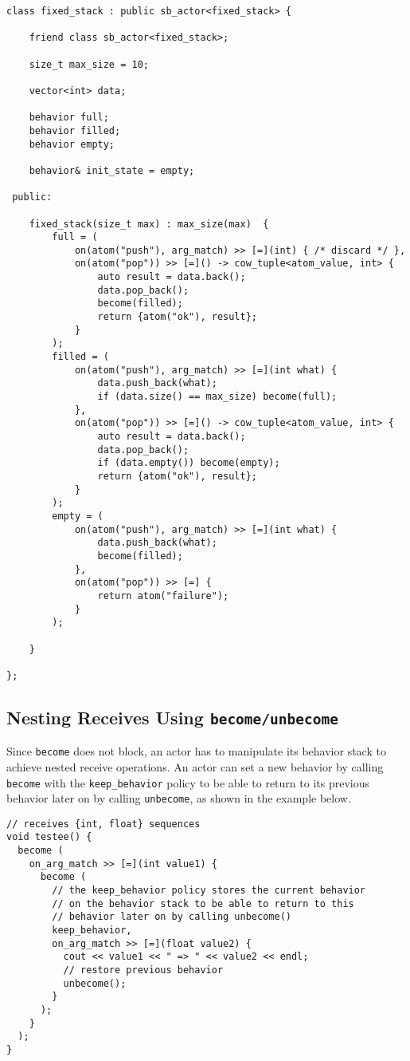 \clearpage
\begin{lstlisting}
class fixed_stack : public sb_actor<fixed_stack> {

    friend class sb_actor<fixed_stack>;

    size_t max_size = 10;

    vector<int> data;

    behavior full;
    behavior filled;
    behavior empty;

    behavior& init_state = empty;

 public:

    fixed_stack(size_t max) : max_size(max)  {
        full = (
            on(atom("push"), arg_match) >> [=](int) { /* discard */ },
            on(atom("pop")) >> [=]() -> cow_tuple<atom_value, int> {
                auto result = data.back();
                data.pop_back();
                become(filled);
                return {atom("ok"), result};
            }
        );
        filled = (
            on(atom("push"), arg_match) >> [=](int what) {
                data.push_back(what);
                if (data.size() == max_size) become(full);
            },
            on(atom("pop")) >> [=]() -> cow_tuple<atom_value, int> {
                auto result = data.back();
                data.pop_back();
                if (data.empty()) become(empty);
                return {atom("ok"), result};
            }
        );
        empty = (
            on(atom("push"), arg_match) >> [=](int what) {
                data.push_back(what);
                become(filled);
            },
            on(atom("pop")) >> [=] {
                return atom("failure");
            }
        );

    }

};
\end{lstlisting}

\clearpage
\subsection{Nesting Receives Using \lstinline^become/unbecome^}

Since \lstinline^become^ does not block, an actor has to manipulate its behavior stack to achieve nested receive operations.
An actor can set a new behavior by calling \lstinline^become^ with the \lstinline^keep_behavior^ policy to be able to return to its previous behavior later on by calling \lstinline^unbecome^, as shown in the example below.

\begin{lstlisting}
// receives {int, float} sequences
void testee() {
  become (
    on_arg_match >> [=](int value1) {
      become (
        // the keep_behavior policy stores the current behavior
        // on the behavior stack to be able to return to this
        // behavior later on by calling unbecome()
        keep_behavior,
        on_arg_match >> [=](float value2) {
          cout << value1 << " => " << value2 << endl;
          // restore previous behavior
          unbecome();
        }
      );
    }
  );
}
\end{lstlisting}

